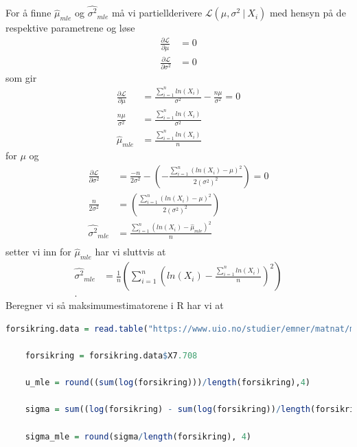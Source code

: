 \documentclass[12pt,
               a4paper,
               article,
               oneside,
               oldfontcommands,
               norsk]{memoir}
\begin{document}
For å finne $\hat{\mu}_{mle}$ og $\hat{\sigma^2}_{mle}$ må vi partiellderivere $\mathcal{L}(\mu, \sigma^2 \ | \ X_i)$ med hensyn på de respektive parametrene og løse
\begin{align*}
    \frac{\partial \mathcal{L}}{\partial \mu} &= 0 \\[7pt]
    \frac{\partial \mathcal{L}}{\partial \sigma^2} &= 0
\end{align*}
som gir 
\begin{align*}
    \frac{\partial \mathcal{L}}{\partial \mu} &= \frac{\sum_{i=1}^{n} ln(X_i)}{\sigma^2} - \frac{n \mu}{\sigma^2} = 0 \\[7pt]
    \frac{n \mu}{\sigma^2} &= \frac{\sum_{i=1}^{n} ln(X_i)}{\sigma^2} \\[7pt]
    \hat{\mu}_{mle} &=  \frac{\sum_{i=1}^{n} ln(X_i)}{n}
\end{align*}
for $\mu$ og 
\begin{align*}
    \frac{\partial \mathcal{L}}{\partial \sigma^2} &= \frac{-n}{2 \sigma^2} - \left(- \frac{\sum_{i=1}^{n} (ln(X_i) - \mu)^2}{ 2 (\sigma^2)^2} \right) = 0 \\[7pt]
    \frac{n}{2\sigma^2} &=  \left(\frac{\sum_{i=1}^{n} (ln(X_i) - \mu)^2}{ 2 (\sigma^2)^2} \right) \\[7pt]
    \hat{\sigma^2}_{mle} &= \frac{\sum_{i = 1}^{n}(ln(X_i) - \hat{\mu}_{mle})^2}{n} \\[7pt]  
\end{align*}
setter vi inn for $\hat{\mu}_{mle}$ har vi sluttvis at 
\begin{align*}
    \hat{\sigma^2}_{mle} &= \frac{1}{n} \left(\sum_{i = 1}^{n}\left(ln(X_i)- \frac{\sum_{i=1}^{n}ln(X_i)}{n}\right)^2\right) \\[7pt].
\end{align*}
Beregner vi så maksimumestimatorene i R har vi at \vspace{4mm}\\
\begin{lstlisting}[language=R]
    forsikring.data = read.table("https://www.uio.no/studier/emner/matnat/math/STK1110/data/forsikringskrav.txt", header=T)

    forsikring = forsikring.data$X7.708

    u_mle = round((sum(log(forsikring)))/length(forsikring),4)

    sigma = sum((log(forsikring) - sum(log(forsikring))/length(forsikring))^2)

    sigma_mle = round(sigma/length(forsikring), 4)
\end{lstlisting}
\end{document}
